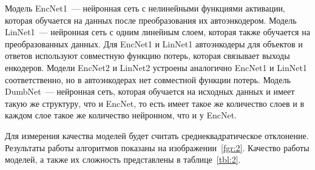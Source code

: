 \documentclass[12pt, twoside]{article}
\begin{document}
Модель EncNet1~--- нейронная сеть с нелинейными функциями активации, которая обучается на данных после преобразования их автоэнкодером. Модель LinNet1~--- нейронная сеть с одним линейным слоем, которая также обучается на преобразованных данных. Для EncNet1 и LinNet1 автоэнкодеры для объектов и ответов используют совместную функцию потерь, которая связывает выходы енкодеров. Модели EncNet2 и LinNet2 устроены аналогично EncNet1 и LinNet1 соответственно, но в автоэнкодерах нет совместной функции потерь. Модель DumbNet~---  нейронная сеть, которая обучается на исходных данных и имеет такую же структуру, что и EncNet, то есть имеет такое же количество слоев и в каждом слое такое же количество нейронном, что и у EncNet.

Для измерения качества моделей будет считать среднеквадратическое отклонение. Результаты работы алгоритмов показаны на изображении~\eqref{fgr:2}. Качество работы моделей, а также их сложность представлены в таблице~\eqref{tbl:2}.
\end{document}
